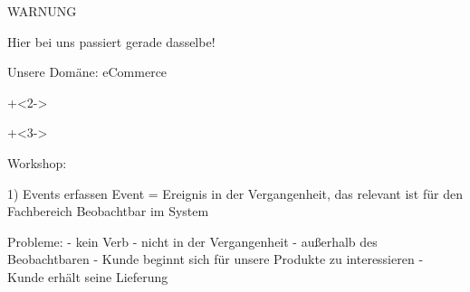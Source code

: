 \begin{frame}[fragile]{}


\end{frame}


\begin{frame}[fragile]{WARNUNG}

\begin{center}
{
\LARGE
Hier bei uns passiert gerade dasselbe!
}
\end{center}

\end{frame}




\begin{frame}[fragile]{Unsere Domäne: eCommerce}


\onslide+<2->

\onslide+<3->

\end{frame}


Workshop:

1) Events erfassen
Event = Ereignis in der Vergangenheit, das relevant ist für den Fachbereich
Beobachtbar im System


Probleme:
- kein Verb
- nicht in der Vergangenheit
- außerhalb des Beobachtbaren
  - Kunde beginnt sich für unsere Produkte zu interessieren
  - Kunde erhält seine Lieferung


